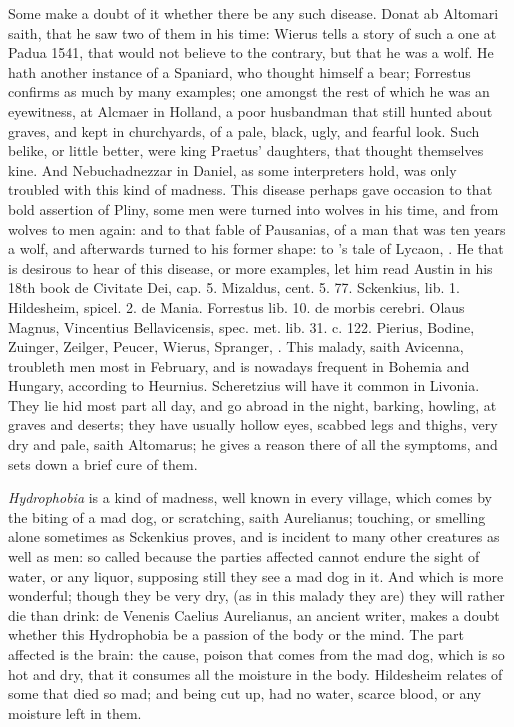 {Some make a doubt of it whether there be any such disease. Donat
ab Altomari saith, that he saw two of them in his time: Wierus
tells a story of such a one at Padua 1541, that would not believe to
the contrary, but that he was a wolf. He hath another instance of a
Spaniard, who thought himself a bear; Forrestus confirms as much
by many examples; one amongst the rest of which he was an eyewitness,
at Alcmaer in Holland, a poor husbandman that still hunted about
graves, and kept in churchyards, of a pale, black, ugly, and fearful
look. Such belike, or little better, were king Praetus' daughters,
that thought themselves kine. And Nebuchadnezzar in Daniel, as some
interpreters hold, was only troubled with this kind of madness. This
disease perhaps gave occasion to that bold assertion of Pliny,
some men were turned into wolves in his time, and from wolves to men
again: and to that fable of Pausanias, of a man that was ten years a
wolf, and afterwards turned to his former shape: to \Ovid's tale of
Lycaon, \etc{}. He that is desirous to hear of this disease, or more
examples, let him read Austin in his 18th book de Civitate Dei, cap. 5.
Mizaldus, cent. 5. 77. Sckenkius, lib. 1. Hildesheim, spicel. 2. de
Mania. Forrestus lib. 10. de morbis cerebri. Olaus Magnus, Vincentius
Bellavicensis, spec. met. lib. 31. c. 122. Pierius, Bodine, Zuinger,
Zeilger, Peucer, Wierus, Spranger, \etc{}. This malady, saith Avicenna,
troubleth men most in February, and is nowadays frequent in Bohemia and
Hungary, according to Heurnius. Scheretzius will have it common in
Livonia. They lie hid most part all day, and go abroad in the night,
barking, howling, at graves and deserts; they have usually hollow
eyes, scabbed legs and thighs, very dry and pale, saith Altomarus;
he gives a reason there of all the symptoms, and sets down a brief cure
of them.

\emph{Hydrophobia} is a kind of madness, well known in every village, which
comes by the biting of a mad dog, or scratching, saith Aurelianus;
touching, or smelling alone sometimes as Sckenkius proves, and is
incident to many other creatures as well as men: so called because the
parties affected cannot endure the sight of water, or any liquor,
supposing still they see a mad dog in it. And which is more wonderful;
though they be very dry, (as in this malady they are) they will rather
die than drink: de Venenis Caelius Aurelianus, an ancient writer,
makes a doubt whether this Hydrophobia be a passion of the body or the
mind. The part affected is the brain: the cause, poison that comes from
the mad dog, which is so hot and dry, that it consumes all the moisture
in the body.  Hildesheim relates of some that died so mad; and
being cut up, had no water, scarce blood, or any moisture left in them.

}
